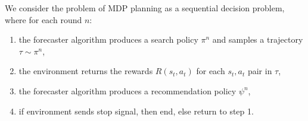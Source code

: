 \documentclass{article}
\newcommand{\todo}[1]{\hl{TODO: #1}}
\theoremstyle{plain}
\begin{document}
        
        We consider the problem of MDP planning as a sequential decision problem, where for each round $n$:
        \begin{enumerate}
            \item the forecaster algorithm produces a search policy $\pi^n$ and samples a trajectory $\tau\sim\pi^n$,
            \item the environment returns the rewards $R(s_t,a_t)$ for each $s_t,a_t$ pair in $\tau$,
            \item the forecaster algorithm produces a recommendation policy $\psi^n$,
            \item if environment sends stop signal, then end, else return to step 1.
        \end{enumerate}
        
\end{document}
